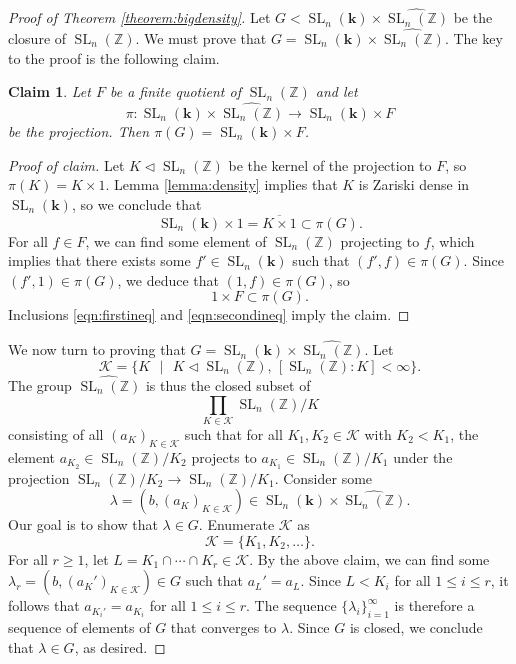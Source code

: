\documentclass[11pt]{article}
\numberwithin{equation}{section}
\theoremstyle{plain}
\newtheorem*{claim}{Claim}
\theoremstyle{definition}
\theoremstyle{remark}
\DeclareMathOperator{\SL}{SL}
\newcommand\Z{\ensuremath{\mathbb{Z}}}
\newcommand\Set[2]{\ensuremath{\{\text{#1 $|$ #2}\}}}
\newcommand\cK{\ensuremath{\mathcal{K}}}
\newcommand\bk{\ensuremath{\mathbf{k}}}
\newcommand\tSLn{\ensuremath{\widehat{\SL_n(\Z)}}}
\begin{document}
\begin{proof}[Proof of Theorem \ref{theorem:bigdensity}]
Let $G < \SL_n(\bk) \times \tSLn$ be the closure of $\SL_n(\Z)$.  We must prove that
$G = \SL_n(\bk) \times \tSLn$.  The key to the proof is the following claim.

\begin{claim}
Let $F$ be a finite quotient of $\SL_n(\Z)$ and let
\[\pi\colon \SL_n(\bk) \times \tSLn \rightarrow \SL_n(\bk) \times F\]
be the projection.  Then $\pi(G) = \SL_n(\bk) \times F$.
\end{claim}
\begin{proof}[Proof of claim]
Let $K \lhd \SL_n(\Z)$ be the kernel of the projection to $F$, so $\pi(K) = K \times 1$.  
Lemma \ref{lemma:density} implies that $K$ is Zariski dense in $\SL_n(\bk)$, so we conclude that
\begin{equation}
\label{eqn:firstineq}
\SL_n(\bk) \times 1 = \overline{K \times 1} \subset \pi(G).
\end{equation}
For all $f \in F$, we can find some element of $\SL_n(\Z)$ projecting to $f$, which implies that
there exists some $f' \in \SL_n(\bk)$ such that $(f',f) \in \pi(G)$.  Since $(f',1) \in \pi(G)$, we
deduce that $(1,f) \in \pi(G)$, so
\begin{equation}
\label{eqn:secondineq}
1 \times F \subset \pi(G).
\end{equation}
Inclusions \ref{eqn:firstineq} and \ref{eqn:secondineq} imply the claim.
\end{proof}

We now turn to proving that $G = \SL_n(\bk) \times \tSLn$.  Let 
\[\cK = \Set{$K$}{$K \lhd \SL_n(\Z)$, $[\SL_n(\Z):K] < \infty$}.\]
The group $\tSLn$ is thus the closed subset of
\[\prod_{K \in \cK} \SL_n(\Z)/K\]
consisting of all $(a_K)_{K \in \cK}$ such that for all $K_1,K_2 \in \cK$ with $K_2 < K_1$, the element
$a_{K_2} \in \SL_n(\Z)/K_2$ projects to $a_{K_1} \in \SL_n(\Z)/K_1$ under the projection
$\SL_n(\Z)/K_2 \rightarrow \SL_n(\Z)/K_1$.  
Consider some
\[\lambda = (b,(a_K)_{K \in \cK}) \in \SL_n(\bk) \times \tSLn.\]
Our goal is to show that $\lambda \in G$.  Enumerate $\cK$ as
\[\cK = \{K_1,K_2,\ldots\}.\]
For all $r \geq 1$, let $L = K_1 \cap \cdots \cap K_r \in \cK$.  By the above claim, we can find
some $\lambda_r = (b,(a_K')_{K \in \cK}) \in G$ such that $a_{L}' = a_L$.  Since $L < K_i$ for
all $1 \leq i \leq r$, it follows that $a_{K_i'} = a_{K_i}$ for all $1 \leq i \leq r$.  The
sequence $\{\lambda_i\}_{i=1}^{\infty}$ is therefore a sequence of elements of $G$ that converges to
$\lambda$.  Since $G$ is closed, we conclude that $\lambda \in G$, as desired.
\end{proof}
\end{document}
